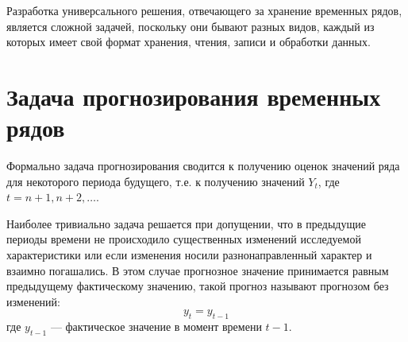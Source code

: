 Разработка универсального решения, отвечающего за хранение временных рядов, является сложной задачей, 
поскольку они бывают разных видов, каждый из которых имеет свой формат хранения, чтения, записи 
и обработки данных.

\section{Задача прогнозирования временных рядов}

Формально задача прогнозирования сводится к получению оценок значений ряда для некоторого периода 
будущего, т.е. к получению значений $Y_{t}$, где $t = n + 1, n + 2, \ldots$.

Наиболее тривиально задача решается при допущении, что в предыдущие периоды времени не происходило 
существенных изменений исследуемой характеристики или если изменения носили разнонаправленный характер 
и взаимно погашались. В этом случае прогнозное значение принимается равным предыдущему фактическому 
значению, такой прогноз называют прогнозом без изменений:
\begin{equation}
	y_{t} = y_{t-1}
\end{equation}
где $y_{t-1}$ — фактическое значение в момент времени $t - 1$.